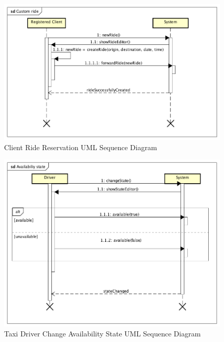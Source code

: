 \documentclass[a4paper]{article}
\begin{document}
\begin{enumerate}[label=\bfseries G\arabic*:]
\begin{figure}[H]
\includegraphics[width=\sequenceWidth]{Sequence-Client-RideReservation}
\centering
\caption{Client Ride Reservation UML Sequence Diagram}
\label{fig:sequenceclientridereservation}
\end{figure}

\begin{figure}[H]
\includegraphics[width=\sequenceWidth]{Sequence-TaxiDriver-ChangeAvailabilityState}
\centering
\caption{Taxi Driver Change Availability State UML Sequence Diagram}
\label{fig:sequencetaxidriverchangestate}
\end{figure}


\end{enumerate}
\end{document}
